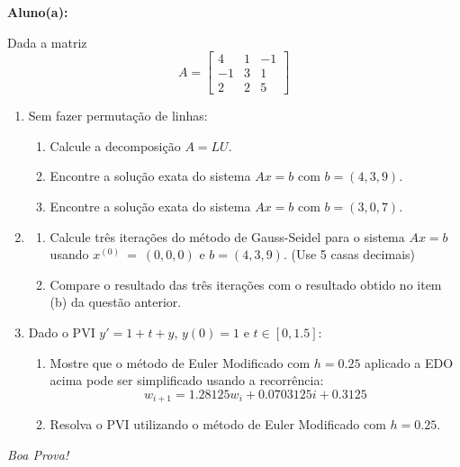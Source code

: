 \documentclass[a4paper,5pt]{amsbook}
\begin{document}
\vspace{0.5cm}
{\bf Aluno(a):}\dotfill{}  %

\vspace{0.2cm}
\vspace{0.5cm}
Dada a matriz
\[A = \left[
		\begin{array}{rrr}
			4 & 1 & -1 \\
			-1 & 3 & 1 \\
			2 & 2 & 5
		\end{array}\right]\]
\begin{enumerate}
\vspace{0.5cm}

	\item Sem fazer permuta\c{c}\~ao de linhas:
			\vspace{0.2cm}
		\begin{enumerate}
			\item Calcule a decomposi\c{c}\~ao $A = LU$.
			\vspace{0.2cm}
			\item Encontre a solu\c{c}\~ao exata do sistema $Ax=b$ com $b = (4, 3, 9)$.
			\vspace{0.2cm}
			\item Encontre a solu\c{c}\~ao exata do sistema $Ax=b$ com $b = (3, 0, 7)$.
		\end{enumerate}
	\vspace{0.5cm}

	\item 
		\begin{enumerate}
			\item Calcule tr\^es itera\c{c}\~oes do m\'etodo de Gauss-Seidel para o
				sistema $Ax = b$ usando $x^{(0)}~=~(0,0,0)$ e $b=(4,3,9)$. (Use
				5 casas decimais)
			\vspace{0.2cm}
			\item Compare o resultado das tr\^es itera\c{c}\~oes com o resultado obtido no item (b) da quest\~ao anterior.
		\end{enumerate}
	\vspace{0.5cm}

	\item Dado o PVI $y' = 1 + t + y$, $y(0) = 1$ e $t\in{}[0, 1.5]$:
		\begin{enumerate}
			\vspace{0.2cm}
			\item Mostre que o m\'etodo de Euler Modificado com $h=0.25$ aplicado a EDO acima pode ser simplificado usando a recorr\^encia:
				\[w_{i+1} = 1.28125 w_i + 0.0703125 i + 0.3125\]
			\vspace{0.2cm}
			\item Resolva o PVI utilizando o m\'etodo de Euler Modificado com $h=0.25$.
		\end{enumerate}
	\vspace{0.5cm}
\end{enumerate}

\begin{flushright}
	\vspace{1cm}
	\textit{Boa Prova!}
\end{flushright}
\end{document}
